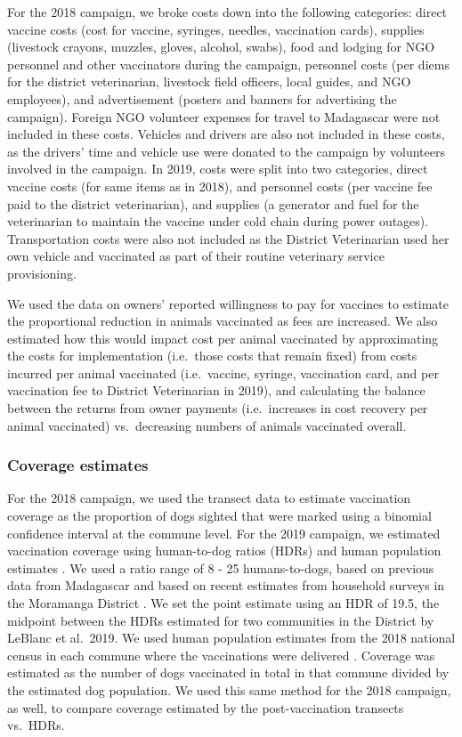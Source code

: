 \documentclass[tropicalmed,article,submit,moreauthors,pdftex]{mdpi}
\begin{document}
For the 2018 campaign, we broke costs down into the following
categories: direct vaccine costs (cost for vaccine, syringes, needles,
vaccination cards), supplies (livestock crayons, muzzles, gloves,
alcohol, swabs), food and lodging for NGO personnel and other
vaccinators during the campaign, personnel costs (per diems for the
district veterinarian, livestock field officers, local guides, and NGO
employees), and advertisement (posters and banners for advertising the
campaign). Foreign NGO volunteer expenses for travel to Madagascar were
not included in these costs. Vehicles and drivers are also not included
in these costs, as the drivers' time and vehicle use were donated to the
campaign by volunteers involved in the campaign. In 2019, costs were
split into two categories, direct vaccine costs (for same items as in
2018), and personnel costs (per vaccine fee paid to the district
veterinarian), and supplies (a generator and fuel for the veterinarian
to maintain the vaccine under cold chain during power outages).
Transportation costs were also not included as the District Veterinarian
used her own vehicle and vaccinated as part of their routine veterinary
service provisioning.

We used the data on owners' reported willingness to pay for vaccines to
estimate the proportional reduction in animals vaccinated as fees are
increased. We also estimated how this would impact cost per animal
vaccinated by approximating the costs for implementation (i.e.~those
costs that remain fixed) from costs incurred per animal vaccinated
(i.e.~vaccine, syringe, vaccination card, and per vaccination fee to
District Veterinarian in 2019), and calculating the balance between the
returns from owner payments (i.e.~increases in cost recovery per animal
vaccinated) vs.~decreasing numbers of animals vaccinated overall.

\hypertarget{coverage-estimates}{%
\subsubsection{Coverage estimates}\label{coverage-estimates}}

For the 2018 campaign, we used the transect data to estimate vaccination
coverage as the proportion of dogs sighted that were marked using a
binomial confidence interval at the commune level. For the 2019
campaign, we estimated vaccination coverage using human-to-dog ratios
(HDRs) and human population estimates
\citep{cleaveland2003, athingo2020}. We used a ratio range of 8 - 25
humans-to-dogs, based on previous data from Madagascar
\citep{ratsitorahina2009} and based on recent estimates from household
surveys in the Moramanga District
\citep{leblancclaireRabiesMadagascarThreepronged2019}. We set the point
estimate using an HDR of 19.5, the midpoint between the HDRs estimated
for two communities in the District by LeBlanc et al.~2019. We used
human population estimates from the 2018 national census in each commune
where the vaccinations were delivered \citep{instat2021}. Coverage was
estimated as the number of dogs vaccinated in total in that commune
divided by the estimated dog population. We used this same method for
the 2018 campaign, as well, to compare coverage estimated by the
post-vaccination transects vs.~HDRs.
\end{document}
